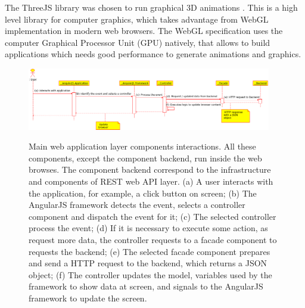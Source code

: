 \documentclass[journal]{IEEEtran}
\begin{document}
The ThreeJS library was chosen to run graphical 3D animations \cite{Dirksen2015}.
This is a high level library for computer graphics, 
which takes advantage from WebGL implementation in modern web browsers.
The WebGL specification \cite{Matsuda2013} uses the computer Graphical Processor Unit (GPU) natively, 
that allows to build applications which needs good performance to generate animations and graphics.

\begin{figure}[tb]
	\centering
	{\includegraphics[width=0.95\textwidth]{./web_components.eps}}
	\caption{Main web application layer components interactions.
		All these components, except the component backend, run inside the web browses.
		The component backend correspond to the infrastructure and components of REST web API layer.
		(a) A user interacts with the application, for example, a click button on screen;
		(b) The AngularJS framework detects the event, selects a controller component and
		dispatch the event for it;
		(c) The selected controller process the event;
		(d) If it is necessary to execute some action, as request more data, the controller 
		requests to a facade component to requests the backend;
		(e) The selected facade component prepares and send a HTTP request to the backend,
		which returns a JSON object;
		(f) The controller updates the model, variables used by the framework to show data at screen,
		and signals to the AngularJS framework to update the screen.
	}
	\label{web_components}
\end{figure}
\end{document}
